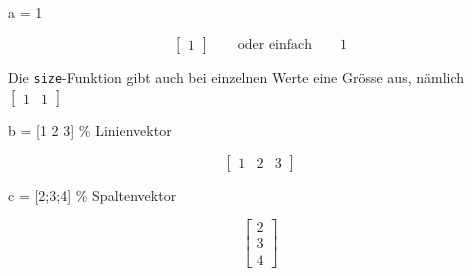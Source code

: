 \documentclass[
  10pt,
  a4paper,
  german]{article}
\newenvironment{Shaded}{}{}
\newcommand{\CommentTok}[1]{\textcolor[rgb]{0.42,0.45,0.49}{#1}}
\newcommand{\FloatTok}[1]{\textcolor[rgb]{0.00,0.36,0.77}{#1}}
\newcommand{\NormalTok}[1]{\textcolor[rgb]{0.14,0.16,0.18}{#1}}
\newcommand{\OperatorTok}[1]{\textcolor[rgb]{0.14,0.16,0.18}{#1}}
\newcommand{\VariableTok}[1]{\textcolor[rgb]{0.89,0.38,0.04}{#1}}
\numberwithin{equation}{section}
\begin{document}
\begin{multicols}{2}
\begin{tcolorbox}
\end{tcolorbox}

\begin{Shaded}
\begin{Highlighting}[]
\VariableTok{a} \OperatorTok{=} \FloatTok{1}
\end{Highlighting}
\end{Shaded}

\[
\begin{bmatrix}
1
\end{bmatrix}\qquad \text{oder einfach}\qquad 1 
\]

Die \texttt{size}-Funktion gibt auch bei einzelnen Werte eine Grösse
aus, nämlich \(\begin{bmatrix}1 & 1\end{bmatrix}\)

\begin{Shaded}
\begin{Highlighting}[]
\VariableTok{b} \OperatorTok{=}\NormalTok{ [}\FloatTok{1} \FloatTok{2} \FloatTok{3}\NormalTok{] }\CommentTok{\% Linienvektor}
\end{Highlighting}
\end{Shaded}

\[
\begin{bmatrix}
1 & 2 & 3
\end{bmatrix}
\]

\begin{Shaded}
\begin{Highlighting}[]
\VariableTok{c} \OperatorTok{=}\NormalTok{ [}\FloatTok{2}\OperatorTok{;}\FloatTok{3}\OperatorTok{;}\FloatTok{4}\NormalTok{] }\CommentTok{\% Spaltenvektor}
\end{Highlighting}
\end{Shaded}

\[
\begin{bmatrix}
2 \\ 3 \\ 4
\end{bmatrix}
\]

\begin{tcolorbox}[enhanced jigsaw, rightrule=.15mm, toprule=.15mm, leftrule=.75mm, opacityback=0, title=\textcolor{quarto-callout-tip-color}{\faLightbulb}\hspace{0.5em}{Slicing}, opacitybacktitle=0.6, colback=white, arc=.35mm, bottomrule=.15mm, colframe=quarto-callout-tip-color-frame, coltitle=black, bottomtitle=1mm, left=2mm, toptitle=1mm, breakable, titlerule=0mm, colbacktitle=quarto-callout-tip-color!10!white]


\end{tcolorbox}
\end{multicols}
\end{document}

